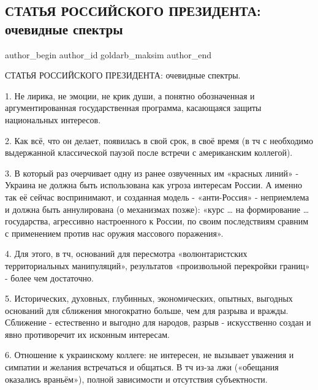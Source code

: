  
 
 
 
 
 
\subsection{СТАТЬЯ РОССИЙСКОГО ПРЕЗИДЕНТА: очевидные спектры}
\label{sec:13_07_2021.fb.goldarb_maksim.1.statja_putina}
 
\ifcmt
 author_begin
   author_id goldarb_maksim
 author_end
\fi

СТАТЬЯ РОССИЙСКОГО ПРЕЗИДЕНТА: очевидные спектры.

1. Не лирика, не эмоции, не крик души, а понятно обозначенная и
аргументированная государственная программа, касающаяся защиты национальных
интересов.

2. Как всё, что он делает, появилась в свой срок, в своё время (в тч с
необходимо выдержанной классической паузой после встречи с американским
коллегой).

3. В который раз очерчивает одну из ранее озвученных им «красных линий» -
Украина не должна быть использована как угроза интересам России. А именно так
её сейчас воспринимают, и созданная модель - «анти-Россия» - неприемлема и
должна быть аннулирована (о механизмах позже): «курс … на формирование
…государства, агрессивно настроенного к России, по своим последствиям сравним с
применением против нас оружия массового поражения».

4. Для этого, в тч, оснований для пересмотра «волюнтаристских территориальных
манипуляций», результатов «произвольной перекройки границ» - более чем
достаточно.

5. Исторических, духовных, глубинных, экономических, опытных, выгодных
оснований для сближения многократно больше, чем для разрыва и вражды. Сближение
- естественно и выгодно для народов, разрыв - искусственно создан и явно
противоречит их исконным интересам. 

6. Отношение к украинскому коллеге: не интересен, не вызывает уважения и
симпатии и желания встречаться и общаться. В тч из-за лжи («обещания оказались
враньём»), полной зависимости и отсутствия субъектности. 

